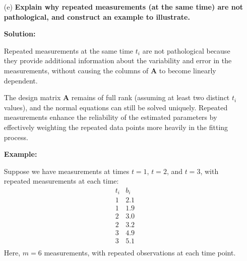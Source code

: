 \documentclass{article}
\newcommand{\mA}{\mathbf{A}}
\newcommand{\vx}{\mathbf{x}}
\newcommand{\ve}{\mathbf{e}}
\newcommand{\vb}{\mathbf{b}}
\begin{document}
{\begin{enumerate}
    Recall that $\ve = \vb - \mA \vx$. The sum of the errors is:
    \[
    \sum_{i=1}^m e_i = \ve^\top \mathbf{1},
    \]
    where $\mathbf{1}$ is a vector of ones.

    From part (c), we have established that $\ve^\top \mA = 0$. Specifically, since the first column of $\mA$ is $\mathbf{1}$ (corresponding to the intercept $C$), we have:
    \[
    \ve^\top \mA = \ve^\top \begin{bmatrix} \mathbf{1} & \mathbf{t} \end{bmatrix} = \begin{bmatrix} \ve^\top \mathbf{1} & \ve^\top \mathbf{t} \end{bmatrix} = \mathbf{0}^\top.
    \]
    This implies that:
    \[
    \ve^\top \mathbf{1} = 0.
    \]
    Therefore:
    \[
    \sum_{i=1}^m e_i = 0.
    \]

    \item[(e)] \textbf{Explain why repeated measurements (at the same time) are not pathological, and construct an example to illustrate.}

    \textbf{Solution:}

    Repeated measurements at the same time $t_i$ are not pathological because they provide additional information about the variability and error in the measurements, without causing the columns of $\mA$ to become linearly dependent.

    The design matrix $\mA$ remains of full rank (assuming at least two distinct $t_i$ values), and the normal equations can still be solved uniquely. Repeated measurements enhance the reliability of the estimated parameters by effectively weighting the repeated data points more heavily in the fitting process.

    \textbf{Example:}

    Suppose we have measurements at times $t = 1$, $t = 2$, and $t = 3$, with repeated measurements at each time:
    \[
    \begin{array}{ccc}
    t_i & b_i \\
    \hline
    1 & 2.1 \\
    1 & 1.9 \\
    2 & 3.0 \\
    2 & 3.2 \\
    3 & 4.9 \\
    3 & 5.1 \\
    \end{array}
    \]
    Here, $m = 6$ measurements, with repeated observations at each time point.


\end{enumerate}}
\end{document}
